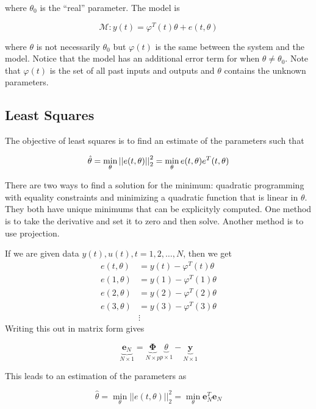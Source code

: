 where $\theta_0$ is the ``real'' parameter.
The model is

\begin{equation*}
\mathcal{M}: y(t) = \varphi^T(t)\theta + e(t,\theta)
\end{equation*}

where $\theta$ is not necessarily $\theta_0$ but $\varphi(t)$ is the same between the system and the model.
Notice that the model has an additional error term for when $\theta\neq\theta_0$.
Note that $\varphi(t)$ is the set of all past inputs and outputs and $\theta$ contains the unknown parameters.

\subsection{Least Squares}
The objective of least squares is to find an estimate of the parameters such that

\begin{equation*}
\hat{\theta} = \min_\theta\left|\left|e(t,\theta)\right|\right|_2^2 = \min_\theta e(t,\theta)e^T(t,\theta)
\end{equation*}

There are two ways to find a solution for the minimum: quadratic programming with equality constraints and minimizing a quadratic function that is linear in $\theta$.
They both have unique minimums that can be explicityly computed.
One method is to take the derivative and set it to zero and then solve.
Another method is to use projection.

If we are given data $y(t),u(t),t=1,2,\ldots,N$, then we get
\begin{align*}
e(t,\theta) &= y(t) - \varphi^T(t)\theta \\
e(1,\theta) &= y(1) - \varphi^T(1)\theta \\
e(2,\theta) &= y(2) - \varphi^T(2)\theta \\
e(3,\theta) &= y(3) - \varphi^T(3)\theta \\
&\vdots
\end{align*}
Writing this out in matrix form gives

\begin{equation*}
\underbrace{\mathbf{e}_N}_{N\times 1} = \underbrace{\mathbf{\Phi}}_{N\times p}\underbrace{\theta}_{p\times 1} - \underbrace{\mathbf{y}}_{N\times 1}
\end{equation*}

This leads to an estimation of the parameters as

\begin{equation*}
\hat{\theta} = \min_\theta ||e(t,\theta)||_2^2 = \min_\theta \mathbf{e}_N^T\mathbf{e}_N
\end{equation*}

